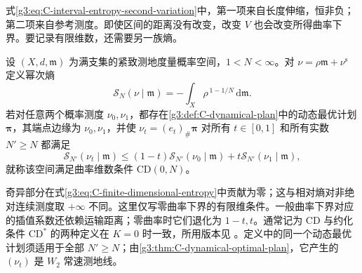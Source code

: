 式\eqref{g3:eq:C-interval-entropy-second-variation}中，第一项来自长度伸缩，恒非负；第二项来自参考测度。即使区间的距离没有改变，改变 \(V\) 也会改变所得曲率下界。要记录有限维数，还需要另一族熵。

\begin{definition}\label{g3:def:C-cd-zero-finite-dimension}
	设 \((X,d,\mathfrak m)\) 为满支集的紧致测地度量概率空间，\(1<N<\infty\)。对
	\(\nu=\rho\mathfrak m+\nu^{\mathrm s}\) 定义幂次熵
	\begin{equation}\label{g3:eq:C-finite-dimensional-entropy}
		\mathcal S_N(\nu\mid\mathfrak m)
		    =-\int_X\rho^{\,1-1/N}\,\mathrm d\mathfrak m.
	\end{equation}
	若对任意两个概率测度 \(\nu_0,\nu_1\)，都存在\cref{g3:def:C-dynamical-plan}中的动态最优计划 \(\boldsymbol\pi\)，其端点边缘为 \(\nu_0,\nu_1\)，并使 \(\nu_t=(e_t)_\#\boldsymbol\pi\) 对所有 \(t\in[0,1]\) 和所有实数 \(N'\ge N\) 都满足
	\begin{equation}\label{g3:eq:C-cd-zero-finite}
		\mathcal S_{N'}(\nu_t\mid\mathfrak m)
		\le(1-t)\mathcal S_{N'}(\nu_0\mid\mathfrak m)
		   +t\mathcal S_{N'}(\nu_1\mid\mathfrak m),
	\end{equation}
	就称该空间满足曲率维数条件 \(\mathrm{CD}(0,N)\)。
\end{definition}

奇异部分在式\eqref{g3:eq:C-finite-dimensional-entropy}中贡献为零；这与相对熵对非绝对连续测度取 \(+\infty\) 不同。这里仅写零曲率下界的有限维条件。一般曲率下界对应的插值系数还依赖运输距离；零曲率时它们退化为 \(1-t,t\)。通常记为 \(\mathrm{CD}\) 与约化条件 \(\mathrm{CD}^*\) 的两种定义在 \(K=0\) 时一致，所用版本见 \cite[定义2.5及其后说明，作者稿第9--10页]{MondinoNaber2019Structure}。定义中的同一个动态最优计划须适用于全部 \(N'\ge N\)；由\cref{g3:thm:C-dynamical-optimal-plan}，它产生的 \((\nu_t)\) 是 \(W_2\) 常速测地线。

